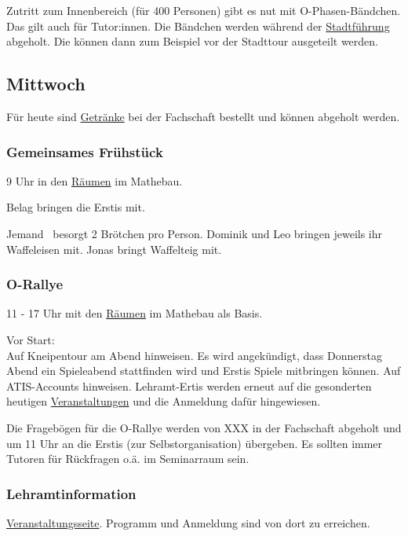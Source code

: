 \documentclass[10pt,ngerman]{scrartcl}
\begin{document}
\begin{multicols}{2}
Zutritt zum Innenbereich (für 400 Personen) gibt es nut mit O-Phasen-Bändchen.
Das gilt auch für Tutor:innen.
Die Bändchen werden während der \hyperref[stadt]{Stadtführung} abgeholt.
Die können dann zum Beispiel vor der Stadttour ausgeteilt werden.

\subsection{Mittwoch}

Für heute sind \hyperref[drinks]{Getränke} bei der Fachschaft bestellt und können abgeholt werden.

\subsubsection{Gemeinsames Frühstück}\label{mibreakfast}

9 Uhr in den \hyperref[rooms]{Räumen} im Mathebau.

Belag bringen die Erstis mit.

Jemand\texttrademark~ besorgt 2 Brötchen pro Person.
Dominik und Leo bringen jeweils ihr Waffeleisen mit.
Jonas bringt Waffelteig mit.

\subsubsection{O-Rallye}

11 - 17 Uhr mit den \hyperref[rooms]{Räumen} im Mathebau als Basis.

Vor Start: \\
Auf Kneipentour am Abend hinweisen.
Es wird angekündigt, dass Donnerstag Abend ein Spieleabend stattfinden wird und Erstis Spiele mitbringen können.
Auf ATIS-Accounts hinweisen.
Lehramt-Ertis werden erneut auf die gesonderten heutigen \hyperref[lehramt]{Veranstaltungen} und die Anmeldung dafür hingewiesen.

Die Fragebögen für die O-Rallye werden von XXX in der Fachschaft
abgeholt und um 11 Uhr an die Erstis (zur Selbstorganisation) übergeben.
Es sollten immer Tutoren für Rückfragen o.ä. im Seminarraum sein.

\subsubsection{Lehramtinformation}\label{lehramt}

\href{https://www.hoc.kit.edu/zlb/Veranstaltungskalender.php/event/46988?}{Veranstaltungsseite}.
Programm und Anmeldung sind von dort zu erreichen.


\end{multicols}
\end{document}
